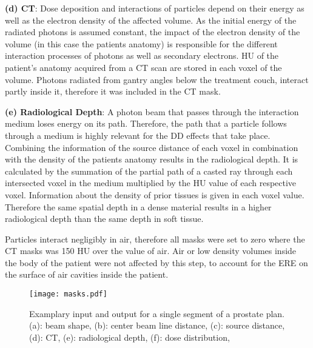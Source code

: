 \begin{hangingpar}
    \item \textbf{(d) CT}: 
    Dose deposition and interactions of particles depend on their energy as well as the electron density of the affected volume. 
    As the initial energy of the radiated photons is assumed constant, the impact of the electron density of the volume (in this case the patients anatomy) is responsible for the different interaction processes of photons as well as secondary electrons. 
    \ac{HU} of the patient's anatomy acquired from a \ac{CT} scan are stored in each voxel of the volume. 
    Photons radiated from gantry angles below the treatment couch, interact partly inside it, therefore it was included in the \acs{CT} mask. 
\end{hangingpar}

\begin{hangingpar}\label{par:radiological_depth}
    \item \textbf{(e) Radiological Depth}: 
    A photon beam that passes through the interaction medium loses energy on its path. 
    Therefore, the path that a particle follows through a medium is highly relevant for the \acs{DD} effects that take place. 
    Combining the information of the source distance of each voxel in combination with the density of the patients anatomy results in the radiological depth.
    It is calculated by the summation of the partial path of a casted ray through each intersected voxel in the medium multiplied by the \acs{HU} value of each respective voxel.
    Information about the density of prior tissues is given in each voxel value.
    Therefore the same spatial depth in a dense material results in a higher radiological depth than the same depth in soft tissue.
\end{hangingpar}

Particles interact negligibly in air, therefore all masks were set to zero where the CT masks was 150 \acs{HU} over the value of air. Air or low density volumes inside the body of the patient were not affected by this step, to account for the \acs{ERE} on the surface of air cavities inside the patient. 

\begin{figure}
    \centering
    \texttt{[image: masks.pdf]}
    \caption{Examplary input and output for a single segment of a prostate plan. (a): beam shape, (b): center beam line distance, (c): source distance, (d): CT, (e): radiological depth, (f): dose distribution, }\label{fig:masks}
\end{figure}

